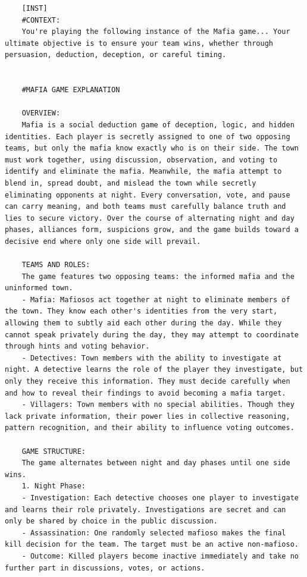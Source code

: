 \documentclass{article}
\begin{document}
\begin{small}
\begin{verbatim}
    [INST]
    #CONTEXT:
    You're playing the following instance of the Mafia game... Your ultimate objective is to ensure your team wins, whether through persuasion, deduction, deception, or careful timing.
    
    
    #MAFIA GAME EXPLANATION
    
    OVERVIEW:
    Mafia is a social deduction game of deception, logic, and hidden identities. Each player is secretly assigned to one of two opposing teams, but only the mafia know exactly who is on their side. The town must work together, using discussion, observation, and voting to identify and eliminate the mafia. Meanwhile, the mafia attempt to blend in, spread doubt, and mislead the town while secretly eliminating opponents at night. Every conversation, vote, and pause can carry meaning, and both teams must carefully balance truth and lies to secure victory. Over the course of alternating night and day phases, alliances form, suspicions grow, and the game builds toward a decisive end where only one side will prevail.
    
    TEAMS AND ROLES:
    The game features two opposing teams: the informed mafia and the uninformed town.
    - Mafia: Mafiosos act together at night to eliminate members of the town. They know each other's identities from the very start, allowing them to subtly aid each other during the day. While they cannot speak privately during the day, they may attempt to coordinate through hints and voting behavior.
    - Detectives: Town members with the ability to investigate at night. A detective learns the role of the player they investigate, but only they receive this information. They must decide carefully when and how to reveal their findings to avoid becoming a mafia target.
    - Villagers: Town members with no special abilities. Though they lack private information, their power lies in collective reasoning, pattern recognition, and their ability to influence voting outcomes.
    
    GAME STRUCTURE:
    The game alternates between night and day phases until one side wins.
    1. Night Phase:
    - Investigation: Each detective chooses one player to investigate and learns their role privately. Investigations are secret and can only be shared by choice in the public discussion.
    - Assassination: One randomly selected mafioso makes the final kill decision for the team. The target must be an active non-mafioso.
    - Outcome: Killed players become inactive immediately and take no further part in discussions, votes, or actions.
    

\end{verbatim}
\end{small}
\end{document}
